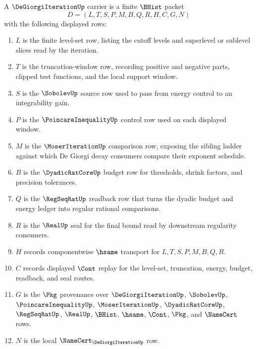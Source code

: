 \begin{definition}
\label{def:de-giorgi-iteration-carrier}
A $\DeGiorgiIterationUp$ carrier is a finite $\BHist$ packet
$$
D=(L,T,S,P,M,B,Q,R,H,C,G,N)
$$
with the following displayed rows:
\begin{enumerate}
\item $L$ is the finite level-set row, listing the cutoff levels and superlevel or sublevel slices read by the iteration.
\item $T$ is the truncation-window row, recording positive and negative parts, clipped test functions, and the local support window.
\item $S$ is the $\SobolevUp$ source row used to pass from energy control to an integrability gain.
\item $P$ is the $\PoincareInequalityUp$ control row used on each displayed window.
\item $M$ is the $\MoserIterationUp$ comparison row, exposing the sibling ladder against which De Giorgi decay consumers compare their exponent schedule.
\item $B$ is the $\DyadicRatCoreUp$ budget row for thresholds, shrink factors, and precision tolerances.
\item $Q$ is the $\RegSeqRatUp$ readback row that turns the dyadic budget and energy ledger into regular rational comparisons.
\item $R$ is the $\RealUp$ seal for the final bound read by downstream regularity consumers.
\item $H$ records componentwise $\hsame$ transport for $L,T,S,P,M,B,Q,R$.
\item $C$ records displayed $\Cont$ replay for the level-set, truncation, energy, budget, readback, and seal routes.
\item $G$ is the $\Pkg$ provenance over $\DeGiorgiIterationUp$, $\SobolevUp$, $\PoincareInequalityUp$, $\MoserIterationUp$, $\DyadicRatCoreUp$, $\RegSeqRatUp$, $\RealUp$, $\BHist$, $\hsame$, $\Cont$, $\Pkg$, and $\NameCert$ rows.
\item $N$ is the local $\NameCert_{\DeGiorgiIterationUp}$ row.
\end{enumerate}
\end{definition}

